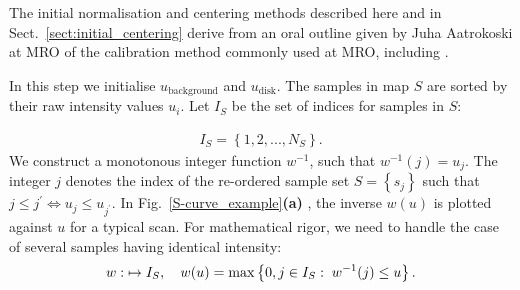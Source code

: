 \documentclass{aa}
\newcommand{\fg}[1]{\textcolor{midblue}{#1}}
\newcommand{\skk}[1]{\textcolor{midorange}{[SKK: #1]}} %
\newcommand{\eqnl}[2]{\begin{eqnarray}\label{#1}#2\end{eqnarray}}
\renewcommand{\max}[1]{\operatorname{max} \left\{ #1 \right\}}
\newcommand{\s}[2]{{#1}_{\mathrm{#2}}}
\begin{document}
  The initial normalisation and centering methods described here and in Sect.~\ref{sect:initial_centering} derive from 
  an oral outline given by Juha Aatrokoski at MRO of the calibration method commonly used at MRO, including 
  \citet{metsahovi40}.


  In this step we initialise $\s{u}{background}$ and $\s{u}{disk}$. The samples in map $S$ are sorted by their raw 
  intensity values $u_i$. 
 Let $I_S$ be the set of indices for samples in $S$:


  \eqnl{S-curve_indices}{
  I_S = \left\{ 1, 2, ..., N_S \right\} \text{.}
  }
  We construct a monotonous integer function $w^{-1}$, such that
  $w^{-1}(j) = u_j$.
  The integer $j$ denotes the index of the re-ordered sample set $S = \left\{ s_j \right\}$ such
  that $j \le j^{\prime} \Leftrightarrow u_{j} \le u_{j^{\prime}}.$
  In Fig.~\ref{S-curve_example}{\bf(a)} , the inverse $w(u)$ is plotted against
  $u$ for a typical scan. For mathematical rigor, we need to handle the case of several samples having identical intensity:
  \eqnl{scurve-inverse-rigor}{
  w:\;\real \mapsto I_S, \quad w(u) = \max{0, j \in I_S:\; w^{-1}(j) \le u} \text{.}
  }


\end{document}
